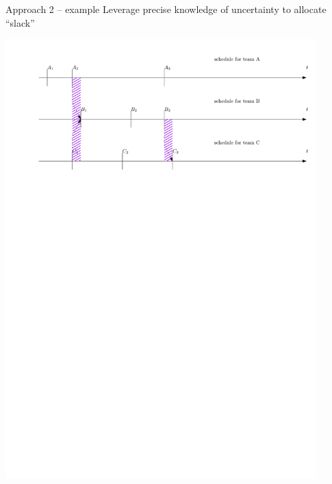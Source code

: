 \begin{frame}{Approach 2 -- example}
	Leverage precise knowledge of uncertainty to allocate ``slack''

	\bigskip

	\begin{center}
		\includegraphics[width=0.9\textwidth]{team-schedules3}
	\end{center}
\end{frame}


